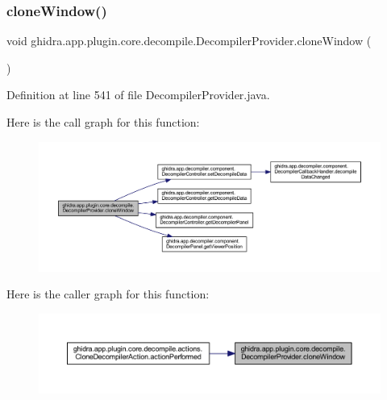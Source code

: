 \subsubsection{\texorpdfstring{cloneWindow()}{cloneWindow()}}
{\footnotesize\ttfamily void ghidra.\+app.\+plugin.\+core.\+decompile.\+Decompiler\+Provider.\+clone\+Window (\begin{DoxyParamCaption}{ }\end{DoxyParamCaption})\hspace{0.3cm}{\ttfamily [inline]}}



Definition at line 541 of file Decompiler\+Provider.\+java.

Here is the call graph for this function\+:
\nopagebreak
\begin{figure}[H]
\begin{center}
\leavevmode
\includegraphics[width=350pt]{classghidra_1_1app_1_1plugin_1_1core_1_1decompile_1_1_decompiler_provider_abee9f64402916ef4a8d48c8e699173d9_cgraph}
\end{center}
\end{figure}
Here is the caller graph for this function\+:
\nopagebreak
\begin{figure}[H]
\begin{center}
\leavevmode
\includegraphics[width=350pt]{classghidra_1_1app_1_1plugin_1_1core_1_1decompile_1_1_decompiler_provider_abee9f64402916ef4a8d48c8e699173d9_icgraph}
\end{center}
\end{figure}
\mbox{\label{classghidra_1_1app_1_1plugin_1_1core_1_1decompile_1_1_decompiler_provider_a0e2fcd2b85d7ae6fe189998b4bcdd984}} 
